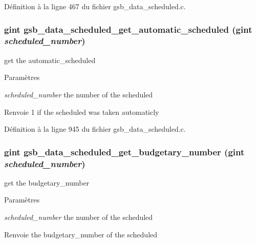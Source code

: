 Définition à la ligne 467 du fichier gsb\_\-data\_\-scheduled.c.

\subsubsection[{gsb\_\-data\_\-scheduled\_\-get\_\-automatic\_\-scheduled}]{\setlength{\rightskip}{0pt plus 5cm}gint gsb\_\-data\_\-scheduled\_\-get\_\-automatic\_\-scheduled (gint {\em scheduled\_\-number})}\label{gsb__data__scheduled_8h_ae5f2deb3539449512d8e9c3bc3011525}
get the automatic\_\-scheduled


\begin{DoxyParams}{Paramètres}
\item[{\em scheduled\_\-number}]the number of the scheduled\end{DoxyParams}
\begin{DoxyReturn}{Renvoie}
1 if the scheduled was taken automaticly 
\end{DoxyReturn}


Définition à la ligne 945 du fichier gsb\_\-data\_\-scheduled.c.

\subsubsection[{gsb\_\-data\_\-scheduled\_\-get\_\-budgetary\_\-number}]{\setlength{\rightskip}{0pt plus 5cm}gint gsb\_\-data\_\-scheduled\_\-get\_\-budgetary\_\-number (gint {\em scheduled\_\-number})}\label{gsb__data__scheduled_8h_a3019884175ba5217da66a26601fbf9f2}
get the budgetary\_\-number


\begin{DoxyParams}{Paramètres}
\item[{\em scheduled\_\-number}]the number of the scheduled\end{DoxyParams}
\begin{DoxyReturn}{Renvoie}
the budgetary\_\-number of the scheduled 
\end{DoxyReturn}


